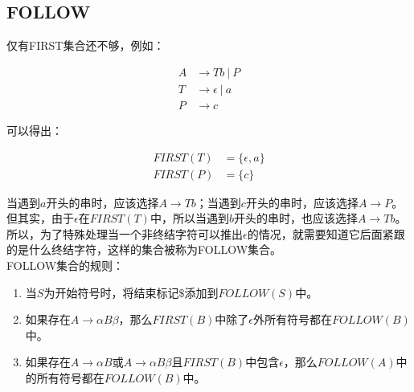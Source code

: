 \vspace{0.5cm}

\subsection{FOLLOW}

仅有FIRST集合还不够，例如：

\vspace{-1cm}

\begin{align*}
    A & \rightarrow     Tb\ |\ P      \\
    T & \rightarrow    \epsilon\ |\ a \\
    P & \rightarrow   c
\end{align*}

可以得出：

\vspace{-1cm}

\begin{align*}
    FIRST(T) & = \{\epsilon, a\} \\
    FIRST(P) & = \{c\}
\end{align*}

当遇到$ a $开头的串时，应该选择$ A \rightarrow Tb $；当遇到$ c $开头的串时，应该选择$ A \rightarrow P $。\\

但其实，由于$ \epsilon $在$ FIRST(T) $中，所以当遇到$ b $开头的串时，也应该选择$ A \rightarrow Tb $。\\

所以，为了特殊处理当一个非终结字符可以推出$ \epsilon $的情况，就需要知道它后面紧跟的是什么终结字符，这样的集合被称为FOLLOW集合。\\

FOLLOW集合的规则：

\begin{enumerate}
    \item 当$ S $为开始符号时，将结束标记$ \$ $添加到$ FOLLOW(S) $中。

    \item 如果存在$ A \rightarrow \alpha B \beta $，那么$ FIRST(B) $中除了$ \epsilon $外所有符号都在$ FOLLOW(B) $中。

    \item 如果存在$ A \rightarrow \alpha B $或$ A \rightarrow \alpha B \beta $且$ FIRST(B) $中包含$ \epsilon $，那么$ FOLLOW(A) $中的所有符号都在$ FOLLOW(B) $中。
\end{enumerate}

\newpage